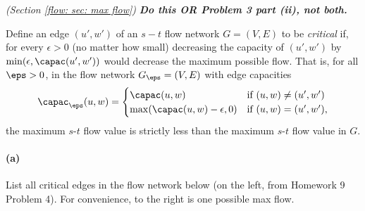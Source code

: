 \documentclass[11pt]{article}
\begin{document}
\setlength{\ITEMHT}{0.6in}
{\injectEnumerate
{}
}





\newpage 

\problem[3 part (i)] \emph{(Section \ref{flow: sec: max flow})}
\textbf{\em Do this OR Problem 3 part (ii), not both.}

Define an edge $(u', w')$ of an $s-t$ flow network $G=(V,E)$ to be \emph{critical} 
if, for every $\epsilon>0$ (no matter how small)
decreasing the capacity of $(u', w')$ by $\min(\epsilon, \capac(u', w'))$ would decrease the maximum possible flow.
That is, for all $\eps>0$, in the flow network $G_\eps=(V, E)$ with edge capacities
\[
  \capac_\eps(u, w) = \begin{cases}
    \capac(u, w) & \text{if } (u, w) \ne (u', w') \\ 
    \max(\capac(u, w) -\epsilon, 0) & \text{if } (u, w) = (u', w'),
  \end{cases}
\]
the maximum $s$-$t$ flow value is strictly less than the maximum $s$-$t$ flow value in $G$.

\paragraph{(a)}
List all critical edges in the flow network below (on the left, from Homework 9 Problem 4).
For convenience, to the right is one possible max flow.
  
\end{document}
